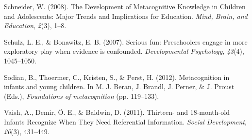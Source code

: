 \documentclass[10pt, letterpaper]{article}
\begin{document}
\hypertarget{ref-Schneider2008}{}
Schneider, W. (2008). The Development of Metacognitive Knowledge in
Children and Adolescents: Major Trends and Implications for Education.
\emph{Mind, Brain, and Education}, \emph{2}(3), 1--8.

\hypertarget{ref-Schulz2007}{}
Schulz, L. E., \& Bonawitz, E. B. (2007). Serious fun: Preschoolers
engage in more exploratory play when evidence is confounded.
\emph{Developmental Psychology}, \emph{43}(4), 1045--1050.

\hypertarget{ref-Sodian2012}{}
Sodian, B., Thoermer, C., Kristen, S., \& Perst, H. (2012).
Metacognition in infants and young children. In M. J. Beran, J. Brandl,
J. Perner, \& J. Proust (Eds.), \emph{Foundations of metacognition} (pp.
119--133).

\hypertarget{ref-Vaish2011}{}
Vaish, A., Demir, Ö. E., \& Baldwin, D. (2011). Thirteen- and
18-month-old Infants Recognize When They Need Referential Information.
\emph{Social Development}, \emph{20}(3), 431--449.
\end{document}
